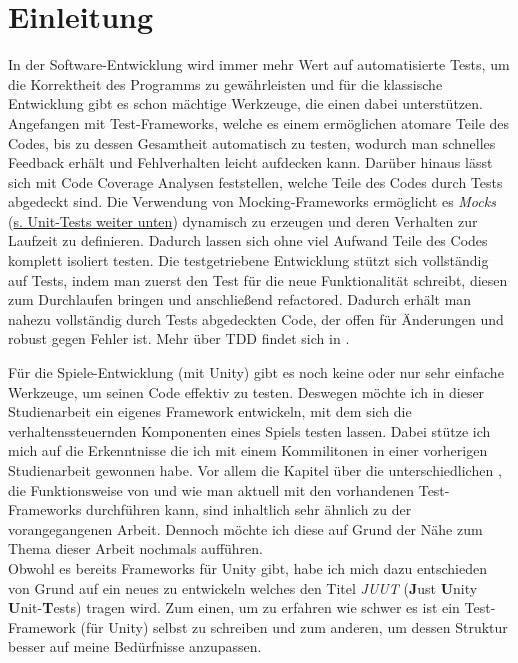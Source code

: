 \chapter{Einleitung}
\label{sec:Einleitung}

In der Software-Entwicklung wird immer mehr Wert auf automatisierte Tests, um die Korrektheit des Programms zu gewährleisten und für die klassische Entwicklung gibt es schon mächtige Werkzeuge, die einen dabei unterstützen. Angefangen mit Test-Frameworks, welche es einem ermöglichen atomare Teile des Codes, bis zu dessen Gesamtheit automatisch zu testen, wodurch man schnelles Feedback erhält und Fehlverhalten leicht aufdecken kann. Darüber hinaus lässt sich mit Code Coverage Analysen feststellen, welche Teile des Codes durch Tests abgedeckt sind. Die Verwendung von Mocking-Frameworks ermöglicht es \textit{Mocks} (\hyperlink{DefinitionMock}{s. Unit-Tests weiter unten}) dynamisch zu erzeugen und deren Verhalten zur Laufzeit zu definieren. Dadurch lassen sich ohne viel Aufwand Teile des Codes komplett isoliert testen. Die testgetriebene Entwicklung stützt sich vollständig auf Tests, indem man zuerst den Test für die neue Funktionalität schreibt, diesen zum Durchlaufen bringen und anschließend refactored. Dadurch erhält man nahezu vollständig durch Tests abgedeckten Code, der offen für Änderungen und robust gegen Fehler ist. Mehr über TDD findet sich in \cite{FRE10}.

Für die Spiele-Entwicklung (mit Unity) gibt es noch keine oder nur sehr einfache Werkzeuge, um seinen Code effektiv zu testen. Deswegen möchte ich in dieser Studienarbeit ein eigenes Framework entwickeln, mit dem sich die verhaltenssteuernden Komponenten eines Spiels testen lassen. Dabei stütze ich mich auf die Erkenntnisse die ich mit einem Kommilitonen in einer vorherigen Studienarbeit \cite{TDGD13} gewonnen habe. Vor allem die Kapitel über die unterschiedlichen , die Funktionsweise von  und wie man aktuell  mit den vorhandenen Test-Frameworks durchführen kann, sind inhaltlich sehr ähnlich zu der vorangegangenen Arbeit. Dennoch möchte ich diese auf Grund der Nähe zum Thema dieser Arbeit nochmals aufführen.\\
Obwohl es bereits Frameworks für Unity gibt, habe ich mich dazu entschieden von Grund auf ein neues zu entwickeln welches den Titel \textit{JUUT} (\textbf{J}ust \textbf{U}nity \textbf{U}nit-\textbf{T}ests) tragen wird. Zum einen, um zu erfahren wie schwer es ist ein Test-Framework (für Unity) selbst zu schreiben und zum anderen, um dessen Struktur besser auf meine Bedürfnisse anzupassen.

